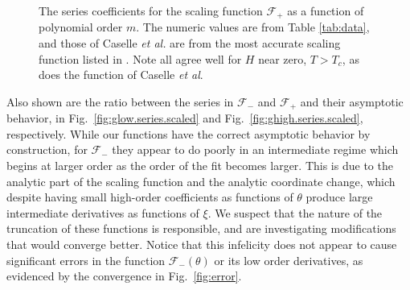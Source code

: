 \documentclass[
aps,
pre,
preprint,
longbibliography,
floatfix
]{revtex4-2}
\begin{document}
\begin{figure}
  \caption{
    The series coefficients for the scaling function $\mathcal F_+$ as a
    function of polynomial order $m$. The numeric values are from Table
    \ref{tab:data}, and those of Caselle \textit{et al.} are from the most
    accurate scaling function listed in \cite{Caselle_2001_The}. Note all agree
    well for $H$ near zero, $T > T_c$, as does the function of Caselle
    \textit{et al}.
  } \label{fig:ghigh.series}
\end{figure}

Also shown are the ratio between the series in $\mathcal F_-$ and $\mathcal
F_+$ and their asymptotic behavior, in Fig.~\ref{fig:glow.series.scaled} and
Fig.~\ref{fig:ghigh.series.scaled}, respectively. While our functions have the
correct asymptotic behavior by construction, for $\mathcal F_-$ they appear to
do poorly in an intermediate regime which begins at larger order as the order
of the fit becomes larger. This is due to the analytic part of the scaling
function and the analytic coordinate change, which despite having small
high-order coefficients as functions of $\theta$ produce large intermediate
derivatives as functions of $\xi$. We suspect that the nature of the truncation
of these functions is responsible, and are investigating modifications that
would converge better.
Notice that this infelicity does not appear to cause significant errors in the function $\mathcal F_-(\theta)$ or its low order derivatives, as evidenced by the convergence in Fig.~\ref{fig:error}.
\end{document}
